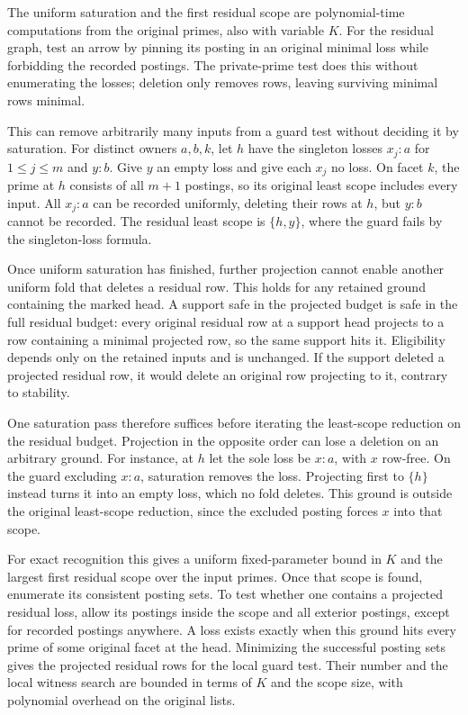 The uniform saturation and the first residual
scope are polynomial-time computations from
the original primes, also with variable $K$.
For the residual graph, test an arrow by pinning
its posting in an original minimal loss while
forbidding the recorded postings. The private-prime
test does this without enumerating the losses;
deletion only removes rows, leaving surviving
minimal rows minimal.

This can remove arbitrarily many inputs from a
guard test without deciding it by saturation.
For distinct owners $a,b,k$, let $h$ have the
singleton losses $x_j:a$ for $1\le j\le m$
and $y:b$. Give $y$ an empty loss and give each
$x_j$ no loss. On facet $k$, the prime at $h$
consists of all $m+1$ postings, so its original
least scope includes every input. All $x_j:a$
can be recorded uniformly, deleting their rows
at $h$, but $y:b$ cannot be recorded. The
residual least scope is $\{h,y\}$, where the
guard fails by the singleton-loss formula.

Once uniform saturation has finished, further
projection cannot enable another uniform fold
that deletes a residual row. This holds for
any retained ground containing the marked
head. A support safe in the projected budget
is safe in the full residual budget: every
original residual row at a support head
projects to a row containing a minimal
projected row, so the same support hits it.
Eligibility depends only on the retained
inputs and is unchanged. If the support
deleted a projected residual row, it would
delete an original row projecting to it,
contrary to stability.

One saturation pass therefore suffices before
iterating the least-scope reduction on the
residual budget. Projection in the opposite
order can lose a deletion on an arbitrary
ground. For instance, at $h$ let the sole
loss be $x:a$, with $x$ row-free. On the guard
excluding $x:a$, saturation removes the loss.
Projecting first to $\{h\}$ instead turns it
into an empty loss, which no fold deletes.
This ground is outside the original
least-scope reduction, since the excluded
posting forces $x$ into that scope.

For exact recognition this gives a uniform
fixed-parameter bound in $K$ and the largest
first residual scope over the input primes.
Once that scope is found, enumerate its
consistent posting sets. To test whether
one contains a projected residual loss,
allow its postings inside the scope and
all exterior postings, except for recorded
postings anywhere. A loss exists exactly
when this ground hits every prime of some
original facet at the head. Minimizing the
successful posting sets gives the projected
residual rows for the local guard test.
Their number and the local witness search
are bounded in terms of $K$ and the scope
size, with polynomial overhead on the
original lists.

